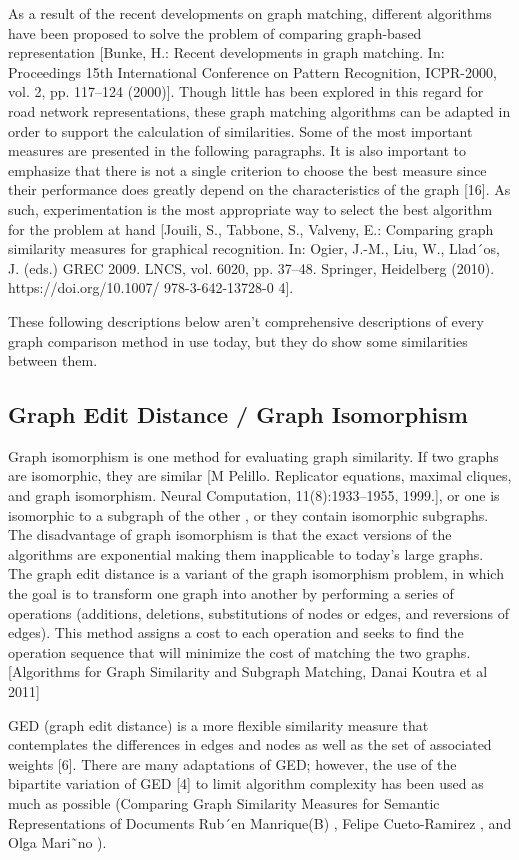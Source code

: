 As a result of the recent developments on graph matching, different algorithms have been proposed to solve the problem of comparing graph-based representation [Bunke, H.: Recent developments in graph matching. In: Proceedings 15th International Conference on Pattern Recognition, ICPR-2000, vol. 2, pp. 117–124 (2000)]. Though little has been explored in this regard for road network representations, these graph matching algorithms can be adapted in order to support the calculation of similarities. Some of the most important measures are presented in the following paragraphs. It is also important to emphasize that there is not a single criterion to choose the best measure since their performance does greatly depend on the characteristics of the graph [16]. As such, experimentation is the most appropriate way to select the best algorithm for the problem at hand [Jouili, S., Tabbone, S., Valveny, E.: Comparing graph similarity measures for graphical recognition. In: Ogier, J.-M., Liu, W., Llad´os, J. (eds.) GREC 2009. LNCS, vol. 6020, pp. 37–48. Springer, Heidelberg (2010). https://doi.org/10.1007/ 978-3-642-13728-0 4]. 

These following descriptions below aren't comprehensive descriptions of every graph comparison method in use today, but they do show some similarities between them.

\subsection{Graph Edit Distance / Graph Isomorphism}
Graph isomorphism is one method for evaluating graph similarity. If two graphs are isomorphic, they are similar [M Pelillo. Replicator equations, maximal cliques, and graph isomorphism. Neural Computation, 11(8):1933–1955, 1999.], or one is isomorphic to a subgraph of the other , or they contain isomorphic subgraphs. The disadvantage of graph isomorphism is that the exact versions of the algorithms are exponential making them inapplicable to today's large graphs.  The graph edit distance is a variant of the graph isomorphism problem, in which the goal is to transform one graph into another by performing a series of operations (additions, deletions, substitutions of nodes or edges, and reversions of edges). This method assigns a cost to each operation and seeks to find the operation sequence that will minimize the cost of matching the two graphs.[Algorithms for Graph Similarity and Subgraph Matching, Danai Koutra et  al 2011]

GED (graph edit distance) is a more flexible similarity measure that contemplates the differences in edges and nodes as well as the set of associated weights [6]. There are many adaptations of GED; however, the use of the bipartite variation of GED [4] to limit algorithm complexity has been used as much as possible (Comparing Graph Similarity Measures for Semantic Representations of Documents Rub´en Manrique(B) , Felipe Cueto-Ramirez , and Olga Mari˜no ). 


